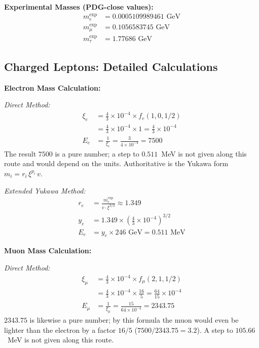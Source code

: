 	\textbf{Experimental Masses (PDG-close values):}
	\begin{align}
		m_e^{\text{exp}} &= 0.0005109989461 \text{ GeV} \\
		m_\mu^{\text{exp}} &= 0.1056583745 \text{ GeV} \\
		m_\tau^{\text{exp}} &= 1.77686 \text{ GeV}
	\end{align}
	
	\subsection{Charged Leptons: Detailed Calculations}
	\label{subsec:charged_leptons_detailed}
	
	\textbf{Electron Mass Calculation:}
	
	\textit{Direct Method:}
	\begin{align}
		\xi_e &= \frac{4}{3} \times 10^{-4} \times f_e(1,0,1/2) \\
		&= \frac{4}{3} \times 10^{-4} \times 1 = \frac{4}{3} \times 10^{-4} \\
		E_{e} &= \frac{1}{\xi_e} = \frac{3}{4 \times 10^{-4}} = 7500
	\end{align}
	The result $7500$ is a pure number; a step to $0.511$~MeV is not given along this route and would depend on the units. Authoritative is the Yukawa form $m_i = r_i\,\xi^{p_i}\,v$.
	
	\textit{Extended Yukawa Method:}
	\begin{align}
		r_e &= \frac{m_e^{\text{exp}}}{v \cdot \xi^{3/2}} \approx 1.349 \\
		y_e &= 1.349 \times \left(\frac{4}{3} \times 10^{-4}\right)^{3/2} \\
		E_e &= y_e \times 246 \text{ GeV} = 0.511 \text{ MeV}
	\end{align}
	
	\textbf{Muon Mass Calculation:}
	
	\textit{Direct Method:}
	\begin{align}
		\xi_\mu &= \frac{4}{3} \times 10^{-4} \times f_\mu(2,1,1/2) \\
		&= \frac{4}{3} \times 10^{-4} \times \frac{16}{5} = \frac{64}{15} \times 10^{-4} \\
		E_{\mu} &= \frac{1}{\xi_\mu} = \frac{15}{64 \times 10^{-4}} = 2343.75
	\end{align}
	$2343.75$ is likewise a pure number; by this formula the muon would even be lighter than the electron by a factor $16/5$ ($7500/2343.75 = 3.2$). A step to $105.66$~MeV is not given along this route.
	

